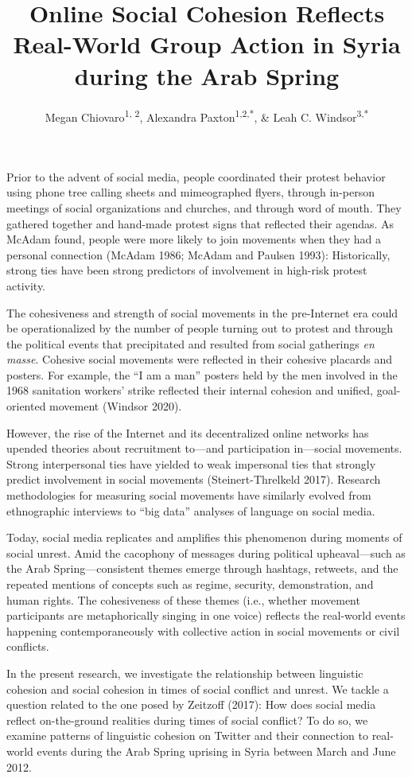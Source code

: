 \documentclass[
  english,
  man]{apa6}
\author{Megan Chiovaro\textsuperscript{1, 2}, Alexandra Paxton\textsuperscript{1,2,*}, \& Leah C. Windsor\textsuperscript{3,*}}
\affiliation{
\vspace{0.5cm}
\textsuperscript{1} Center for the Ecological Study of Perception and Action, University of Connecticut\\\textsuperscript{2} Department of Psychological Sciences, University of Connecticut\\\textsuperscript{3} University of Memphis\\\textsuperscript{*} Equal author contributions}
\title{Online Social Cohesion Reflects Real-World Group Action in Syria during the Arab Spring}
\date{}
\begin{document}
\maketitle

Prior to the advent of social media, people coordinated their protest behavior
using phone tree calling sheets and mimeographed flyers, through in-person
meetings of social organizations and churches, and through word of mouth. They
gathered together and hand-made protest signs that reflected their agendas. As
McAdam found, people were more likely to join movements when they had a personal
connection (McAdam 1986; McAdam and Paulsen 1993): Historically, strong
ties have been strong predictors of involvement in high-risk protest activity.

The cohesiveness and strength of social movements in the pre-Internet era could
be operationalized by the number of people turning out to protest and through
the political events that precipitated and resulted from social gatherings \emph{en
masse}. Cohesive social movements were reflected in their cohesive placards and
posters. For example, the \enquote{I am a man} posters held by the men involved in the
1968 sanitation workers' strike reflected their internal cohesion and unified,
goal-oriented movement (Windsor 2020).

However, the rise of the Internet and its decentralized online networks has
upended theories about recruitment to---and participation in---social movements.
Strong interpersonal ties have yielded to weak impersonal ties that strongly
predict involvement in social movements (Steinert-Threlkeld 2017). Research
methodologies for measuring social movements have similarly evolved from
ethnographic interviews to \enquote{big data} analyses of language on social media.

Today, social media replicates and amplifies this phenomenon during moments of
social unrest. Amid the cacophony of messages during political upheaval---such
as the Arab Spring---consistent themes emerge through hashtags, retweets, and
the repeated mentions of concepts such as regime, security, demonstration, and
human rights. The cohesiveness of these themes (i.e., whether movement
participants are metaphorically singing in one voice) reflects the real-world
events happening contemporaneously with collective action in social movements or
civil conflicts.

In the present research, we investigate the relationship between linguistic
cohesion and social cohesion in times of social conflict and unrest. We tackle a
question related to the one posed by Zeitzoff (2017): How does
social media reflect on-the-ground realities during times of social conflict? To
do so, we examine patterns of linguistic cohesion on Twitter and their
connection to real-world events during the Arab Spring uprising in Syria between
March and June 2012.
\end{document}
